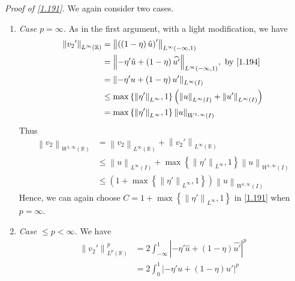 \documentclass[a4paper,oneside]{article}
\numberwithin{equation}{section}
\begin{document}
\textit{Proof of \eqref{1.191}.} We again consider two cases.
\begin{enumerate}
\item \textit{Case $p=\infty$.} As in the first argument, with a light modification, we have
\begin{align}
{\left\| {{v_2}'} \right\|_{{L^\infty }\left( \mathbb{R} \right)}} &= {\left\| {\left( {\left( {1 - \eta } \right)\hat u} \right)'} \right\|_{{L^\infty }\left( { - \infty ,1} \right)}}\\
& = {\left\| { - \eta '\hat u + \left( {1 - \eta } \right)\widehat {u'}} \right\|_{{L^\infty }\left( { - \infty ,1} \right)}},\mbox{ by \eqref{1.194}}\\
& = {\left\| { - \eta 'u + \left( {1 - \eta } \right)u'} \right\|_{{L^\infty }\left( I \right)}}\\
& \le \max \left\{ {{{\left\| {\eta '} \right\|}_{{L^\infty }}},1} \right\}\left( {{{\left\| u \right\|}_{{L^\infty }\left( I \right)}} + {{\left\| {u'} \right\|}_{{L^\infty }\left( I \right)}}} \right)\\
& = \max \left\{ {{{\left\| {\eta '} \right\|}_{{L^\infty }}},1} \right\}{\left\| u \right\|_{{W^{1,\infty }}\left( I \right)}}
\end{align}
Thus
\begin{align}
{\left\| {{v_2}} \right\|_{{W^{1,\infty }}\left( \mathbb{R} \right)}} &= {\left\| {{v_2}} \right\|_{{L^\infty }\left( \mathbb{R} \right)}} + {\left\| {{v_2}'} \right\|_{{L^\infty }\left( \mathbb{R} \right)}}\\
& \le {\left\| u \right\|_{{L^\infty }\left( I \right)}} + \max \left\{ {{{\left\| {\eta '} \right\|}_{{L^\infty }}},1} \right\}{\left\| u \right\|_{{W^{1,\infty }}\left( I \right)}}\\
& \le \left( {1 + \max \left\{ {{{\left\| {\eta '} \right\|}_{{L^\infty }}},1} \right\}} \right){\left\| u \right\|_{{W^{1,\infty }}\left( I \right)}}
\end{align}
Hence, we can again choose $C = 1 + \max \left\{ {{{\left\| {\eta '} \right\|}_{{L^\infty }}},1} \right\}$ in \eqref{1.191} when $p=\infty$.
\item \textit{Case $\le p<\infty$.} We have
\begin{align}
\left\| {{v_2}'} \right\|_{{L^p}\left( \mathbb{R}  \right)}^p &= 2\int_{ - \infty }^1 {{{\left| { - \eta '\hat u + \left( {1 - \eta } \right)\widehat {u'}} \right|}^p}} \\
 &= 2\int_0^1 {{{\left| { - \eta 'u + \left( {1 - \eta } \right)u'} \right|}^p}} \\

\end{align}
\end{enumerate}
\end{document}
